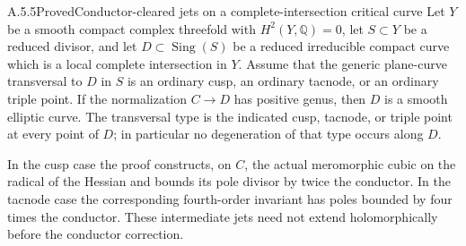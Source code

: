 \begin{statement}{A.5.5}{Proved}{Conductor-cleared jets on a complete-intersection critical curve}
Let $Y$ be a smooth compact complex threefold with
$H^2(Y,\mathbb Q)=0$, let $S\subset Y$ be a reduced divisor,
and let $D\subset\operatorname{Sing}(S)$ be a reduced
irreducible compact curve which is a local complete intersection
in $Y$. Assume that the generic plane-curve transversal to $D$
in $S$ is an ordinary cusp, an ordinary tacnode, or an ordinary
triple point.
If the normalization $C\to D$ has positive genus, then $D$ is
a smooth elliptic curve. The transversal type is the indicated
cusp, tacnode, or triple point at every point of $D$;
in particular no degeneration of that type occurs along $D$.

In the cusp case the proof constructs, on $C$, the actual
meromorphic cubic on the radical of the Hessian and bounds its
pole divisor by twice the conductor. In the tacnode case the
corresponding fourth-order invariant has poles bounded by four
times the conductor. These intermediate jets need not extend
holomorphically before the conductor correction.
\end{statement}
